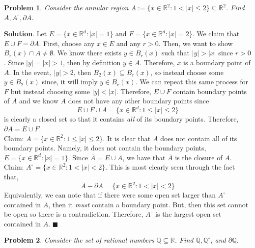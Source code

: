 \documentclass[12pt]{article}
\renewcommand{\=}[1]{\stackrel{#1}{=}} %
\newtheorem{p}{Problem}[section]
\theoremstyle{definition}
\newenvironment{s}{%
        \begin{trivlist} \item \textbf{Solution}. }{%
            \hspace*{\fill} $\blacksquare$\end{trivlist}}%
\begin{document}
\begin{p}
    Consider the annular region $A:= \{x\in\mathbb{R}^2: 1<|x|\leq 2\}\subseteq\mathbb{R}^2$. Find $\bar{A},A^{\circ},\partial{A}$.
\end{p}
\begin{s}
    Let $E = \{x\in\mathbb{R}^d: |x| = 1\}$ and $F = \{x\in\mathbb{R}^d: |x| = 2\}$. We claim that $E \cup F = \partial{A}$.
    First, choose any $x\in E$ and any $r>0$. Then, we want to show $B_r(x)\cap A\neq \emptyset$. We know there exists $y\in B_r(x)$
    such that $|y| > |x|$ since $r>0$. Since $|y| = |x| > 1$, then by definition $y\in A$. Therefore, $x$ is a boundary point
    of $A$. In the event, $|y| > 2$, then $B_{2}(x) \subseteq B_r(x)$, so instead choose some $y\in B_2(x)$ since, it will imply
    $y\in B_r(x)$. We can repeat this same process for $F$ but instead choosing some $|y| < |x|$. Therefore, $E \cup F$ contain
    boundary points of $A$ and we know $A$ does not have any other boundary points since 
    \[ E\cup F \cup A = \{x\in\mathbb{R}^d: 1\leq |x|\leq 2\} \]
    is clearly a closed set so that it contains \textit{all} of its boundary points. Therefore, $\partial{A} = E \cup F$.\\

    Claim: $\bar{A} = \{x\in\mathbb{R}^2: 1\leq|x|\leq 2\}$. It is clear that $A$ does not contain all of its boundary points. 
    Namely, it does not contain the boundary points, $E = \{x\in\mathbb{R}^d: |x| = 1\}$. 
    Since $\bar{A} = E \cup A$, we have that $\bar{A}$ is the closure of $A$. \\

    Claim: $A^{\circ} = \{x\in\mathbb{R}^2: 1<|x|<2\}$. This is most clearly seen through the fact that,
    \[ \bar{A} - \partial{A} = \{x\in\mathbb{R}^2: 1<|x|<2\} \]
    Equivalently, we can note that if there were some open set larger than $A^{\circ}$ contained in $A$, then it \textit{must} contain
    a boundary point. But, then this set cannot be open so there is a contradiction. Therefore, $A^{\circ}$ is the largest
    open set contained in $A$.
\end{s}

\newpage

\begin{p}
    Consider the set of rational numbers $\mathbb{Q}\subseteq\mathbb{R}$. Find $\bar{\mathbb{Q}},\mathbb{Q}^{\circ}$, and
    $\partial{\mathbb{Q}}$.
\end{p}
\end{document}
